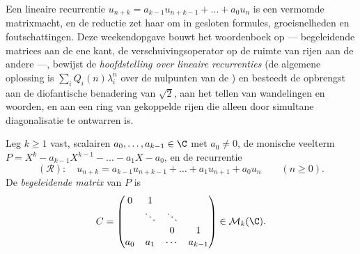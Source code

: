 Een lineaire recurrentie $u_{n+k} = a_{k-1}u_{n+k-1} + \dots + a_0
u_n$ is een vermomde matrixmacht, en de reductie zet haar om in
gesloten formules, groeisnelheden en foutschattingen. Deze
weekendopgave bouwt het woordenboek op --- begeleidende matrices
aan de ene kant, de verschuivingsoperator op de ruimte van rijen
aan de andere ---, bewijst de \emph{hoofdstelling over lineaire
recurrenties} (de algemene oplossing is $\sum_i
Q_i(n)\lambda_i^n$ over de nulpunten van de ) en besteedt de opbrengst aan de diofantische benadering
van $\sqrt2$, aan het tellen van wandelingen en woorden, en aan een
ring van gekoppelde rijen die alleen door simultane diagonalisatie
te ontwarren is.

\begin{problem}
\label{pb:b2:reduction:1}
Leg $k \geq 1$ vast, scalairen $a_0, \dots, a_{k-1} \in \C$ met
$a_0 \neq 0$, de monische veelterm $P = X^k - a_{k-1}X^{k-1} -
\dots - a_1 X - a_0$, en de recurrentie
\[
(\mathcal R)\colon\quad u_{n+k} = a_{k-1}u_{n+k-1} + \dots +
a_1 u_{n+1} + a_0 u_n \qquad (n \geq 0).
\]
De \emph{begeleidende matrix} van $P$ is
\[
C =
\begin{pmatrix}
0 & 1 & & \\
 & \ddots & \ddots & \\
 & & 0 & 1\\
a_0 & a_1 & \cdots & a_{k-1}
\end{pmatrix}
\in \mathcal{M}_k(\C).
\]


\end{problem}
